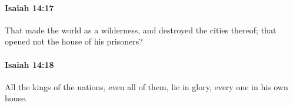 		\paragraph{Isaiah 14:17} %
			\label{ISAIAH-14-17}

			That made the world as a wilderness, and destroyed the cities thereof; that opened not the house of his prisoners?


		\paragraph{Isaiah 14:18} %
			\label{ISAIAH-14-18}

			All the kings of the nations, even all of them, lie in glory, every one in his own house.


